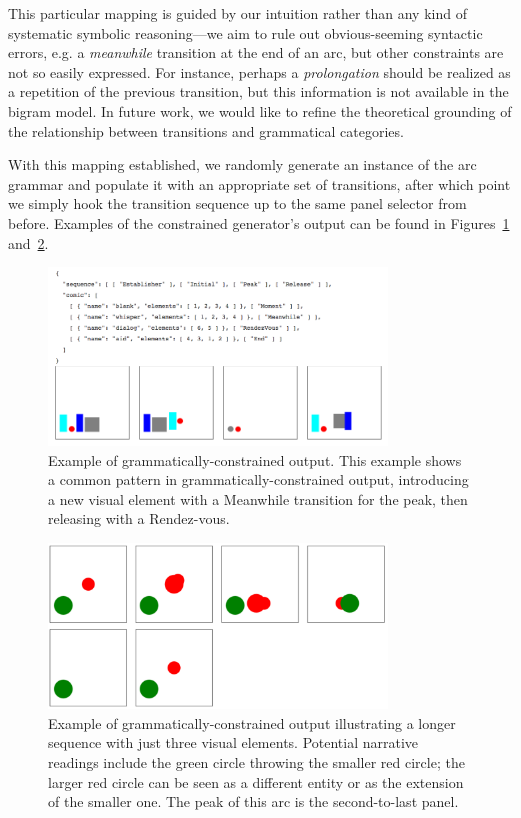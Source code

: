 
This particular mapping is guided by our intuition rather than any kind of
systematic symbolic reasoning---we aim to rule out obvious-seeming
syntactic errors, e.g. a \emph{meanwhile} transition at the end of an arc, but
other constraints are not so easily expressed. For instance, perhaps a
\emph{prolongation} should be realized as a repetition of the previous
transition, but this information is not available in the bigram model. In
future work, we would like to refine the theoretical grounding of the
relationship between transitions and grammatical categories.

With this mapping established, we randomly generate an instance of the
arc grammar and populate it with an appropriate set of transitions, after
which point we simply hook the transition sequence up to the same panel
selector from before.
Examples of the constrained generator's output can be found in
Figures~\ref{fig:outgood} and~\ref{fig:redgreen}.


\begin{figure}
\centering
\includegraphics[width=9cm]{output-constrained-canonical.png}
\caption{Example of grammatically-constrained output.
This example shows a common pattern in grammatically-constrained output,
introducing a new visual element with a Meanwhile transition for the peak,
then releasing with a Rendez-vous.
}
\label{fig:outgood}
\end{figure}

\begin{figure}
\centering
\includegraphics[width=9cm]{comicgen-output-4.png}
\caption{Example of grammatically-constrained output
illustrating a longer sequence with just three visual elements. Potential
narrative readings include the green circle throwing the smaller red
circle; the larger red circle can be seen as a different entity or as the
extension of the smaller one. The peak of this arc is the second-to-last
panel.
}
\label{fig:redgreen}
\end{figure}



